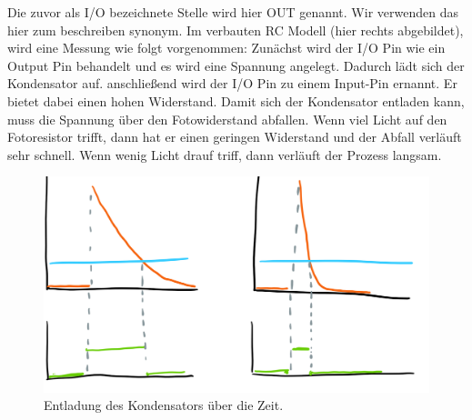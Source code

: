 	
	Die zuvor als I/O bezeichnete Stelle wird hier OUT genannt. Wir verwenden das hier zum beschreiben synonym.
	Im verbauten RC Modell (hier rechts abgebildet), wird eine Messung wie folgt vorgenommen: Zunächst wird der I/O Pin wie ein Output Pin behandelt und es wird eine Spannung angelegt. Dadurch lädt sich der Kondensator auf. anschließend wird  der I/O Pin zu einem Input-Pin ernannt. Er bietet dabei einen hohen Widerstand. Damit sich der Kondensator entladen kann, muss die Spannung über den Fotowiderstand abfallen. Wenn viel Licht auf den Fotoresistor trifft, dann hat er einen geringen Widerstand und der Abfall verläuft sehr schnell. Wenn wenig Licht drauf triff, dann verläuft der Prozess langsam.
	
	\begin{figure}[H]
		\centering
		\label{entladungKodensator}
		\includegraphics[scale=0.5]{img/Sensor/Kurve2.png}
		\caption{Entladung des Kondensators über die Zeit.}
	\end{figure}

